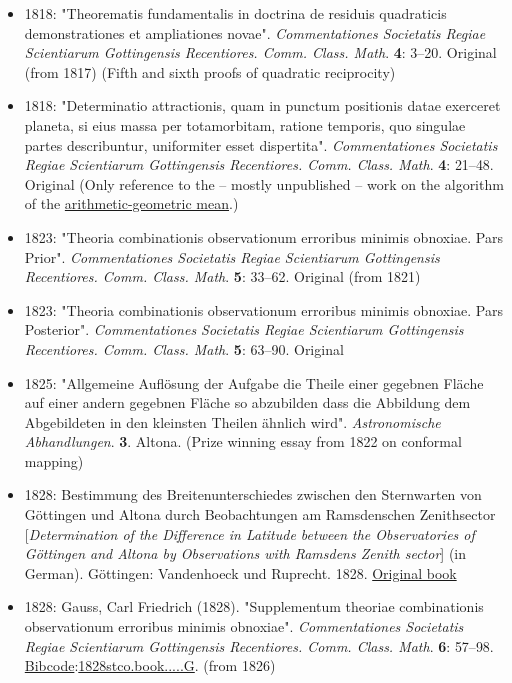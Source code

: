 \begin{itemize}
\item
  {1818: "Theorematis fundamentalis in doctrina de residuis quadraticis demonstrationes et ampliationes novae". \emph{Commentationes Societatis Regiae Scientiarum Gottingensis Recentiores. Comm. Class. Math}. \textbf{4}: {3--}20.{} Original (from 1817) (Fifth and sixth proofs of quadratic reciprocity)}
\item
  {1818: "Determinatio attractionis, quam in punctum positionis datae exerceret planeta, si eius massa per totamorbitam, ratione temporis, quo singulae partes describuntur, uniformiter esset dispertita". \emph{Commentationes Societatis Regiae Scientiarum Gottingensis Recentiores. Comm. Class. Math}. \textbf{4}: {21--}48.{} Original (Only reference to the -- mostly unpublished -- work on the algorithm of the \href{https://en.wikipedia.org/wiki/Arithmetic-geometric_mean}{arithmetic-geometric mean}.)}
\item
  {1823: "Theoria combinationis observationum erroribus minimis obnoxiae. Pars Prior". \emph{Commentationes Societatis Regiae Scientiarum Gottingensis Recentiores. Comm. Class. Math}. \textbf{5}: {33--}62.{} Original (from 1821)}
\item
  {1823: "Theoria combinationis observationum erroribus minimis obnoxiae. Pars Posterior". \emph{Commentationes Societatis Regiae Scientiarum Gottingensis Recentiores. Comm. Class. Math}. \textbf{5}: {63--}90.{} Original}
\item
  {1825: "Allgemeine Auflösung der Aufgabe die Theile einer gegebnen Fläche auf einer andern gegebnen Fläche so abzubilden dass die Abbildung dem Abgebildeten in den kleinsten Theilen ähnlich wird". \emph{Astronomische Abhandlungen}. \textbf{3}. Altona.{} (Prize winning essay from 1822 on conformal mapping)}
\item
  {1828: Bestimmung des Breitenunterschiedes zwischen den Sternwarten von Göttingen und Altona durch Beobachtungen am Ramsdenschen Zenithsector {{[}}\emph{Determination of the Difference in Latitude between the Observatories of Göttingen and Altona by Observations with Ramsden\textquotesingle s Zenith sector}{{]}} (in German). Göttingen: Vandenhoeck und Ruprecht. 1828.{} \href{https://books.google.com/books?id=tIg_AAAAcAAJ&pg=PA04}{Original book}}
\item
  {1828: Gauss, Carl Friedrich (1828). "Supplementum theoriae combinationis observationum erroribus minimis obnoxiae". \emph{Commentationes Societatis Regiae Scientiarum Gottingensis Recentiores. Comm. Class. Math}. \textbf{6}: {57--}98. \href{https://en.wikipedia.org/wiki/Bibcode_(identifier)}{Bibcode}:\href{https://ui.adsabs.harvard.edu/abs/1828stco.book.....G}{1828stco.book.....G}.{} (from 1826)}


\end{itemize}
